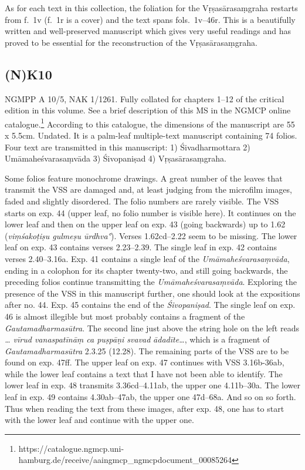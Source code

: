 \documentclass[12pt]{book}
\begin{document}
As for each text in this collection, the foliation for the
Vṛṣasārasaṃgraha restarts from f.~1v (f.~1r is a cover) and the text
spans fols.~1v--46r. This is a beautifully written and well-preserved
manuscript which gives very useful readings and has proved to be
essential for the reconstruction of the Vṛṣasārasaṃgraha.

{%
\subsection{(N)K10}\label{nk10}}

NGMPP A 10/5, NAK 1/1261. Fully collated for chapters 1--12 of the
critical edition in this volume. See a brief description of this MS in
the NGMCP online catalogue.\footnote{https://catalogue.ngmcp.uni-hamburg.de/receive/aaingmcp\_ngmcpdocument\_00085264}
According to this catalogue, the dimensions of the manuscript are 55 x
5.5cm. Undated. It is a palm-leaf multiple-text manuscript containing 74
folios. Four text are transmitted in this manuscript: 1) Śivadharmottara
2) Umāmaheśvarasaṃvāda 3) Śivopaniṣad 4) Vṛṣasārasaṃgraha.

Some folios feature monochrome drawings. A great number of the leaves
that transmit the VSS are damaged and, at least judging from the
microfilm images, faded and slightly disordered. The folio numbers are
rarely visible. The VSS starts on exp. 44 (upper leaf, no folio number
is visible here). It continues on the lower leaf and then on the upper
leaf on exp. 43 (going backwards) up to 1.62 (\emph{viṃśakoṭiṣu gulmeṣu
ūrdhva°}). Verses 1.62cd--2.22 seem to be missing. The lower leaf on
exp. 43 contains verses 2.23--2.39. The single leaf in exp. 42 contains
verses 2.40--3.16a. Exp. 41 contains a single leaf of the
\emph{Umāmaheśvarasaṃvāda}, ending in a colophon for its chapter
twenty-two, and still going backwards, the preceding folios continue
transmitting the \emph{Umāmaheśvarasaṃvāda}. Exploring the presence of
the VSS in this manuscript further, one should look at the expositions
after no. 44. Exp. 45 contains the end of the \emph{Śivopaniṣad}. The
single leaf on exp. 46 is almost illegible but most probably contains a
fragment of the \emph{Gautamadharmasūtra}. The second line just above
the string hole on the left reads \emph{\ldots{} vīrud vanaspatīnāṃ ca
puṣpāṇi svavad} \emph{ādadīte\ldots{}}, which is a fragment of
\emph{Gautamadharmasūtra} 2.3.25 (12.28). The remaining parts of the VSS
are to be found on exp. 47ff. The upper leaf on exp. 47 continues with
VSS 3.16b-36ab, while the lower leaf contains a text that I have not
been able to identify. The lower leaf in exp. 48 transmits
3.36cd--4.11ab, the upper one 4.11b--30a. The lower leaf in exp. 49
contains 4.30ab--47ab, the upper one 47d--68a. And so on so forth. Thus
when reading the text from these images, after exp. 48, one has to start
with the lower leaf and continue with the upper one.
\end{document}
